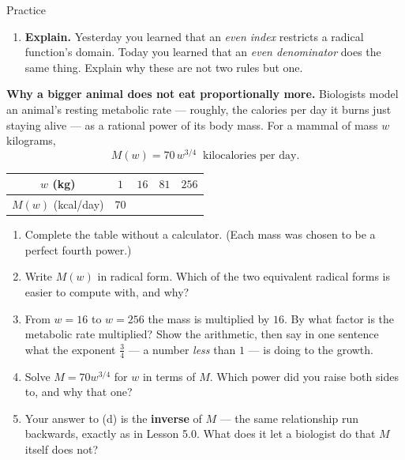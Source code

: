 \documentclass[10pt]{article}
\begin{document}
\begin{notesbox}{Practice}
\begin{enumerate}[leftmargin=1.9em, itemsep=11pt]
  \item \textbf{Explain.} Yesterday you learned that an \emph{even index} restricts a radical
        function's domain. Today you learned that an \emph{even denominator} does the same thing.
        Explain why these are not two rules but one. 
\end{enumerate}
\end{notesbox}

\begin{extensionbox}
\textbf{Why a bigger animal does not eat proportionally more.} Biologists model an animal's resting
metabolic rate --- roughly, the calories per day it burns just staying alive --- as a rational
power of its body mass. For a mammal of mass $w$ kilograms,
\[
  M(w) = 70\,w^{3/4} \ \text{ kilocalories per day.}
\]
\begin{center}
\renewcommand{\arraystretch}{1.25}
\begin{tabular}{|c|c|c|c|c|}
\hline
$w$ (kg)        & $1$ & $16$ & $81$ & $256$ \\ \hline
$M(w)$ (kcal/day) & $70$ & & & \\ \hline
\end{tabular}
\end{center}
\begin{enumerate}[label=(\alph*), leftmargin=1.8em, itemsep=5pt]
  \item Complete the table without a calculator. (Each mass was chosen to be a perfect fourth power.)
  \item Write $M(w)$ in radical form. Which of the two equivalent radical forms is easier to compute
        with, and why?
  \item From $w=16$ to $w=256$ the mass is multiplied by $16$. By what factor is the metabolic rate
        multiplied? Show the arithmetic, then say in one sentence what the exponent $\frac{3}{4}$
        --- a number \emph{less} than $1$ --- is doing to the growth.
  \item Solve $M=70w^{3/4}$ for $w$ in terms of $M$. Which power did you raise both sides to, and
        why that one?
  \item Your answer to (d) is the \textbf{inverse} of $M$ --- the same relationship run backwards,
        exactly as in Lesson 5.0. What does it let a biologist do that $M$ itself does not?
\end{enumerate}
\end{extensionbox}
\end{document}
